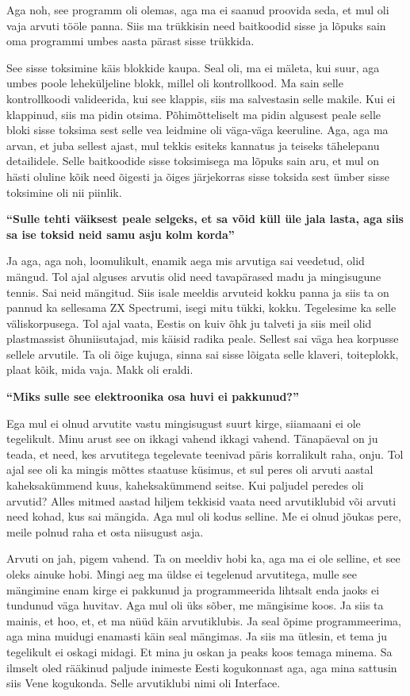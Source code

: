 Aga noh, see programm oli olemas, aga ma ei saanud proovida seda, et mul oli vaja arvuti tööle panna. Siis ma trükkisin need baitkoodid sisse ja  lõpuks sain oma programmi umbes aasta pärast sisse trükkida.

See sisse toksimine käis  blokkide kaupa. Seal oli, ma ei mäleta, kui suur, aga umbes poole leheküljeline blokk, millel oli kontrollkood. Ma sain selle kontrollkoodi valideerida, kui see klappis, siis ma salvestasin selle makile. Kui ei klappinud, siis ma pidin otsima. Põhimõtteliselt ma pidin algusest peale selle bloki sisse toksima sest selle vea leidmine oli väga-väga keeruline. Aga, aga ma arvan, et juba sellest ajast, mul tekkis esiteks kannatus ja teiseks tähelepanu detailidele. Selle baitkoodide sisse toksimisega ma lõpuks sain aru, et mul on hästi oluline kõik need õigesti ja õiges järjekorras sisse toksida sest ümber sisse toksimine oli nii piinlik.


\textbf{\enquote{Sulle tehti väiksest peale selgeks, et sa võid küll üle jala lasta, aga siis sa ise toksid neid samu asju kolm korda}}

Ja aga, aga noh, loomulikult, enamik aega mis arvutiga sai veedetud, olid  mängud. Tol ajal alguses arvutis olid need tavapärased madu ja  mingisugune tennis. Sai neid mängitud. Siis isale meeldis arvuteid kokku panna ja siis ta on pannud ka sellesama ZX Spectrumi, isegi mitu tükki, kokku. Tegelesime ka selle väliskorpusega. Tol ajal vaata, Eestis on kuiv õhk ju talveti ja siis meil olid plastmassist õhuniisutajad, mis käisid radika peale. Sellest sai väga hea korpusse sellele arvutile. Ta oli õige kujuga, sinna sai sisse lõigata selle klaveri, toiteplokk, plaat kõik, mida vaja. Makk oli eraldi.


\textbf{\enquote{Miks sulle see elektroonika osa huvi ei pakkunud?}}

Ega mul ei olnud arvutite vastu mingisugust suurt kirge, siiamaani ei ole tegelikult. Minu arust see on ikkagi vahend ikkagi vahend. Tänapäeval on ju teada, et need, kes arvutitega tegelevate teenivad päris korralikult raha, onju. Tol ajal see oli ka mingis mõttes staatuse küsimus, et sul peres oli arvuti aastal kaheksakümmend kuus, kaheksakümmend seitse. Kui paljudel peredes oli arvutid?  Alles mitmed aastad hiljem tekkisid vaata need arvutiklubid või arvuti need kohad, kus sai mängida. Aga mul oli kodus selline. Me ei olnud jõukas pere, meile polnud raha et osta niisugust asja. 

Arvuti on jah, pigem vahend. Ta  on meeldiv hobi ka, aga ma ei ole selline, et see oleks ainuke hobi. Mingi aeg ma üldse ei tegelenud arvutitega, mulle see mängimine enam kirge ei pakkunud ja programmeerida lihtsalt enda jaoks ei tundunud väga huvitav. Aga mul oli üks sõber, me mängisime koos. Ja siis ta mainis, et hoo, et, et ma nüüd käin arvutiklubis. Ja seal õpime programmeerima, aga mina muidugi enamasti käin seal mängimas. Ja siis ma ütlesin, et tema ju tegelikult ei oskagi midagi. Et mina ju oskan ja peaks koos temaga minema. Sa ilmselt oled rääkinud paljude inimeste Eesti kogukonnast aga, aga mina sattusin siis Vene kogukonda. Selle arvutiklubi nimi oli Interface.

